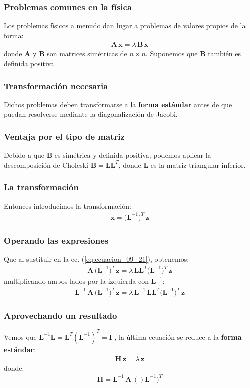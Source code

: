 \documentclass[12pt]{beamer}
\begin{document}
\begin{frame}
\frametitle{Problemas comunes en la física}
Los problemas físicos a menudo dan lugar a problemas de valores propios de la forma:
\pause
\begin{align}
\mathbf{A \, x} = \lambda \, \mathbf{B \, x}
\label{eq:ecuacion_09_21}
\end{align}
donde $\mathbf{A}$ y $\mathbf{B}$ son matrices simétricas de $n \times n$. \pause Suponemos que $\mathbf{B}$ también es definida positiva.
\end{frame}
\begin{frame}
\frametitle{Transformación necesaria}
Dichos problemas deben transformarse a la \textbf{\textcolor{cerulean}{forma estándar}} antes de que puedan resolverse mediante la diagonalización de Jacobi.
\end{frame}
\begin{frame}
\frametitle{Ventaja por el tipo de matriz}
Debido a que $\mathbf{B}$ es simétrica y definida positiva, podemos aplicar la descomposición de Choleski $\mathbf{B} = \mathbf{L L}^{T}$, \pause donde $\mathbf{L}$ es la matriz triangular inferior.
\end{frame}
\begin{frame}
\frametitle{La transformación}
Entonces introducimos la transformación:
\pause
\begin{align}
\mathbf{x} = \big( \mathbf{L}^{-1} \big)^{T} \, \mathbf{z}
\label{eq:ecuacion_09_22}
\end{align}
\end{frame}
\begin{frame}
\frametitle{Operando las expresiones}
Que al sustituir en la ec. (\ref{eq:ecuacion_09_21}), obtenemos:
\pause
\begin{align*}
\mathbf{A} \, \big( \mathbf{L}^{-1} \big)^{T} \, \mathbf{z} = \lambda \, \mathbf{L L}^{T} \big( \mathbf{L}^{-1} \big)^{T} \, \mathbf{z}
\end{align*}
\pause
multiplicando ambos lados por la izquierda con $\mathbf{L}^{-1}$:
\pause
\begin{align*}
\mathbf{L}^{-1} \, \mathbf{A} \, \big( \mathbf{L}^{-1} \big)^{T} \, \mathbf{z} = \lambda \, \mathbf{L}^{-1} \, \mathbf{L L}^{T} \big( \mathbf{L}^{-1} \big)^{T} \, \mathbf{z}
\end{align*}
\end{frame}
\begin{frame}
\frametitle{Aprovechando un resultado}
Vemos que \pause $\mathbf{L}^{-1} \mathbf{L} = \mathbf{L}^{T} (\mathbf{L}^{-1})^{T} = \mathbf{I}$ , \pause la última ecuación se reduce a la \textbf{\textcolor{darkterracotta}{forma estándar}}:
\pause
\begin{align}
\mathbf{H \, z} = \lambda \, \mathbf{z}
\label{eq:ecuacion:09_23}
\end{align}
donde:
\begin{align}
\mathbf{H} = \mathbf{L}^{-1} \, \mathbf{A} \, ()\mathbf{L}^{-1})^{T}
\label{eq:ecuacion_09_24}
\end{align}
\end{frame}
\end{document}
